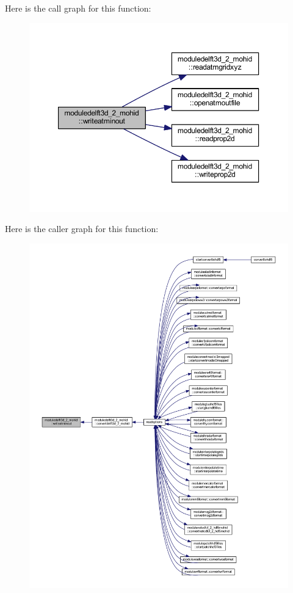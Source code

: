 Here is the call graph for this function\+:\nopagebreak
\begin{figure}[H]
\begin{center}
\leavevmode
\includegraphics[width=350pt]{namespacemoduledelft3d__2__mohid_aaf8ed07f19208b8787807cb35199dca4_cgraph}
\end{center}
\end{figure}
Here is the caller graph for this function\+:\nopagebreak
\begin{figure}[H]
\begin{center}
\leavevmode
\includegraphics[width=350pt]{namespacemoduledelft3d__2__mohid_aaf8ed07f19208b8787807cb35199dca4_icgraph}
\end{center}
\end{figure}
